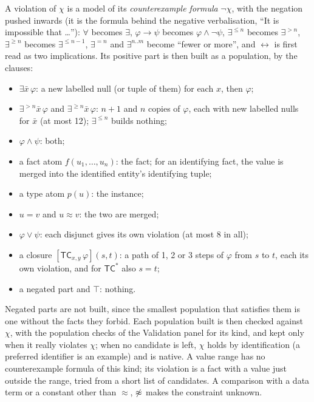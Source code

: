 \documentclass[11pt]{amsart}
\theoremstyle{definition}
\theoremstyle{remark}
\newcommand{\dataEq}{\mathrel{\approx}}
\newcommand{\TC}{\mathsf{TC}}
\begin{document}
A violation of $\chi$ is a model of its \emph{counterexample formula}
$\neg\chi$, with the negation pushed inwards (it is the formula behind the
negative verbalisation, ``It is impossible that \ldots''): $\forall$
becomes $\exists$, $\varphi \to \psi$ becomes $\varphi \wedge \neg\psi$,
$\exists^{\le n}$ becomes $\exists^{> n}$, $\exists^{\ge n}$ becomes
$\exists^{\le n-1}$, $\exists^{= n}$ and $\exists^{n..m}$ become ``fewer
or more'', and $\leftrightarrow$ is first read as two implications. Its
positive part is then built as a population, by the clauses:
\begin{itemize}
  \item $\exists \bar x\,\varphi$: a new labelled null (or tuple of them)
    for each $x$, then $\varphi$;
  \item $\exists^{> n} \bar x\,\varphi$ and $\exists^{\ge n} \bar x\,
    \varphi$: $n+1$ and $n$ copies of $\varphi$, each with new labelled
    nulls for $\bar x$ (at most 12); $\exists^{\le n}$ builds nothing;
  \item $\varphi \wedge \psi$: both;
  \item a fact atom $f(u_1, \ldots, u_n)$: the fact; for an identifying
    fact, the value is merged into the identified entity's identifying
    tuple;
  \item a type atom $p(u)$: the instance;
  \item $u = v$ and $u \dataEq v$: the two are merged;
  \item $\varphi \vee \psi$: each disjunct gives its own violation (at most
    8 in all);
  \item a closure $[\TC_{x,y}\,\varphi](s, t)$: a path of 1, 2 or 3
    steps of $\varphi$ from $s$ to $t$, each its own violation, and for
    $\TC^{*}$ also $s = t$;
  \item a negated part and $\top$: nothing.
\end{itemize}
Negated parts are not built, since the smallest population that satisfies
them is one without the facts they forbid. Each population built is then
checked against $\chi$, with the population checks of the Validation panel
for its kind, and kept only when it really violates $\chi$; when no
candidate is left, $\chi$ holds by identification (a preferred identifier
is an example) and is native. A value range has no counterexample formula of
this kind; its violation is a fact with a value just outside the range,
tried from a short list of candidates. A comparison with a data term or a
constant other than $\dataEq$, $\not\dataEq$ makes the constraint unknown.
\end{document}
